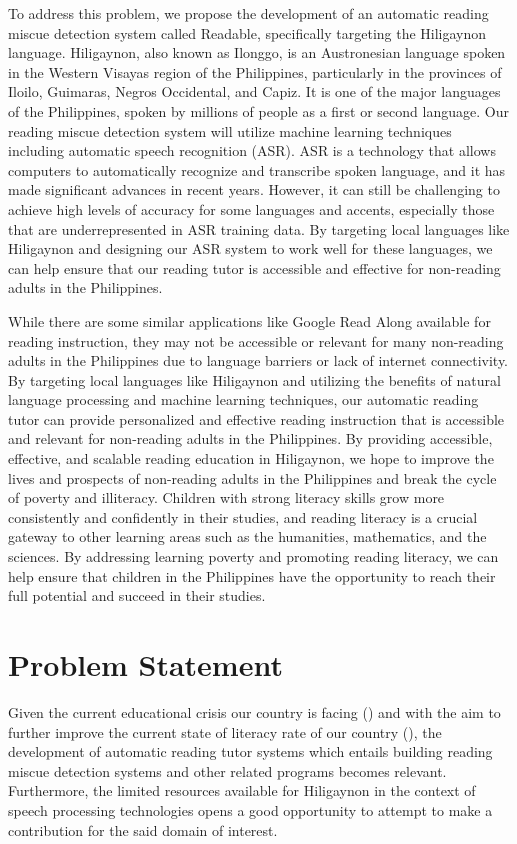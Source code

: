 To address this problem, we propose the development of an automatic reading miscue detection system called Readable, specifically targeting the Hiligaynon language. Hiligaynon, also known as Ilonggo, is an Austronesian language spoken in the Western Visayas region of the Philippines, particularly in the provinces of Iloilo, Guimaras, Negros Occidental, and Capiz. It is one of the major languages of the Philippines, spoken by millions of people as a first or second language.
Our reading miscue detection system will utilize machine learning techniques including automatic speech recognition (ASR). ASR is a technology that allows computers to automatically recognize and transcribe spoken language, and it has made significant advances in recent years. However, it can still be challenging to achieve high levels of accuracy for some languages and accents, especially those that are underrepresented in ASR training data. By targeting local languages like Hiligaynon and designing our ASR system to work well for these languages, we can help ensure that our reading tutor is accessible and effective for non-reading adults in the Philippines.

While there are some similar applications like Google Read Along available for reading instruction, they may not be accessible or relevant for many non-reading adults in the Philippines due to language barriers or lack of internet connectivity. By targeting local languages like Hiligaynon and utilizing the benefits of natural language processing and machine learning techniques, our automatic reading tutor can provide personalized and effective reading instruction that is accessible and relevant for non-reading adults in the Philippines. By providing accessible, effective, and scalable reading education in Hiligaynon, we hope to improve the lives and prospects of non-reading adults in the Philippines and break the cycle of poverty and illiteracy. Children with strong literacy skills grow more consistently and confidently in their studies, and reading literacy is a crucial gateway to other learning areas such as the humanities, mathematics, and the sciences. By addressing learning poverty and promoting reading literacy, we can help ensure that children in the Philippines have the opportunity to reach their full potential and succeed in their studies.

\section{Problem Statement}
Given the current educational crisis our country is facing (\cite{areweoneducationrecovery?_2022}) and with the aim to further improve the current state of  literacy rate of our country (\cite{neil_2020}), the development of automatic reading tutor systems which entails building reading miscue detection systems and other related programs becomes relevant. Furthermore, the limited resources available for Hiligaynon in the context of speech processing technologies opens a good opportunity to attempt to make a contribution for the said domain of interest.


